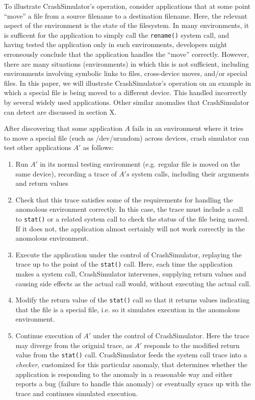 To illustrate CrashSimulator's operation, consider applications that
at some point ``move'' a file from a source filename to a destination filename.
Here, the relevant aspect of the environment is the state of the filesystem.
In many environments, it is sufficent for the application to simply call the {\tt rename()} system call, and having tested
the application only in such environments, developers might erroneously conclude that the application handles the ``move'' correctly.
However, there are many situations (environments) in which this is not sufficient, including environments involving symbolic links to files,
cross-device moves, and/or special files.
In this paper, we will illustrate CrashSimulator's operation on an example in which a special file is being moved to a different device.
This handled incorrectly by several widely used applications. Other similar anomalies that CrashSimulator can detect
are discussed in section X.

After discovering that some application $A$ fails in an environment where it tries to move a special file (such as /dev/urandom) across
devices, crash simulator can test other applications $A'$ as follows:
\begin{enumerate}
	\item
		Run $A'$ in its normal testing environment (e.g. regular file is moved on the same device), recording a trace of $A's$ system calls, including their arguments and return values
	\item
		Check that this trace satisfies some of the requirements for handling the anomolous environment correctly. In this case, the trace must include a call to {\tt stat()} or a related system call to check the status of the file being moved. If it does not, the application almost certainly will not work correctly in the anomolous environment.
	\item Execute the application under the control of CrashSimulator, replaying the trace up to the point of the {\tt stat()} call. Here, each time the application makes a system call, CrashSimulator intervenes, supplying return values and causing side effects as the actual call would, without executing the actual call.
	\item
		Modify the return value of the {\tt stat()} call so that it returns values indicating that the file is a special file, i.e. so it simulates execution in the anomolous environment.
	\item
		Continue execution of $A'$ under the control of CrashSimulator. Here the trace may diverge from the orignial trace, as $A'$ responds to the modified return value from the {\tt stat()} call. CrashSimulator feeds the system call trace into a {\em checker}, customized for this particular anomaly, that determines whether the application is responding to the anomaly in a reasonable way and either reports a bug (failure to handle this anomaly) or eventually syncs up with the trace and continues simulated execution.
\end{enumerate}

